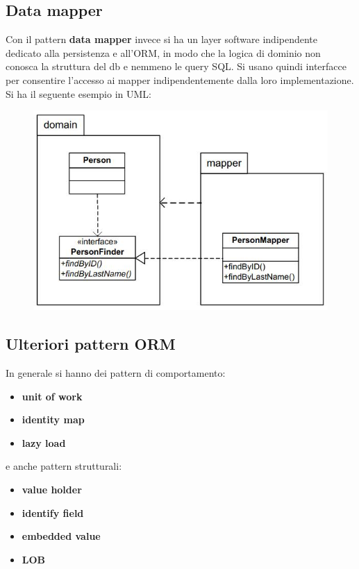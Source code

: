 \documentclass[a4paper,12pt, oneside]{book}
\begin{document}
\subsection{Data mapper}
Con il pattern \textbf{data mapper} invece si ha un layer software indipendente
dedicato alla persistenza e all'ORM, in modo che la logica di dominio non
conosca la struttura del db e nemmeno le query SQL. Si usano quindi interfacce
per consentire l'accesso ai mapper indipendentemente dalla loro
implementazione. Si ha il seguente esempio in UML:
\begin{figure}[H]
  \centering
  \includegraphics[scale = 0.4]{img/dm.jpg}
\end{figure}
\subsection{Ulteriori pattern ORM}
In generale si hanno dei pattern di comportamento:
\begin{itemize}
  \item \textbf{unit of work}
  \item \textbf{identity map}
  \item \textbf{lazy load}
\end{itemize}
e anche pattern strutturali:
\begin{itemize}
  \item \textbf{value holder}
  \item \textbf{identify field}
  \item \textbf{embedded value}
  \item \textbf{LOB}
\end{itemize}
\end{document}
